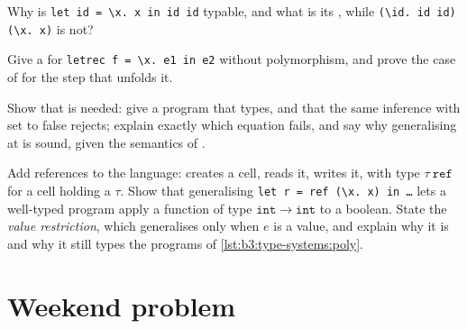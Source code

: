 \begin{exercise}[$\star\star$]\label{exo:b3:type-systems:9}
Why is \texttt{let id = \textbackslash{}x.\ x in id id} typable, and what is its , while \texttt{(\textbackslash{}id.\ id id) (\textbackslash{}x.\ x)} is not?
\end{exercise}

\begin{exercise}[$\star\star\star$]\label{exo:b3:type-systems:10}
Give a  for \texttt{letrec f = \textbackslash{}x.\ e1 in e2} without polymorphism, and prove the case of  for the step that unfolds it.
\end{exercise}

\begin{exercise}[$\star\star\star$]\label{exo:b3:type-systems:11}
Show that  is needed: give a program that  types, and that the same inference with  set to false rejects; explain exactly which equation fails, and say why generalising at  is sound, given the semantics of .
\end{exercise}

\begin{exercise}[$\star\star\star$]\label{exo:b3:type-systems:12}
Add references to the language:  creates a cell,  reads it,  writes it, with type $\tau\ \mathtt{ref}$ for a cell holding a $\tau$. Show that generalising \texttt{let r = ref (\textbackslash{}x.\ x) in \dots{}} lets a well-typed program apply a function of type $\mathtt{int} \to \mathtt{int}$ to a boolean. State the \emph{value restriction}, which generalises  only when $e$ is a value, and explain why it is  and why it still types the programs of \cref{lst:b3:type-systems:poly}.
\end{exercise}

\section{Weekend problem}\label{sec:b3:type-systems:problem}

